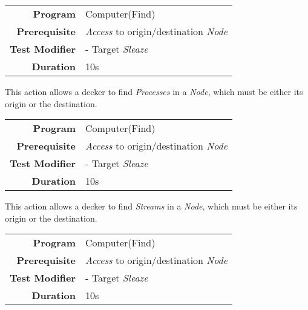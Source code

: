 \label{par:find process}


\begin{tabular}{rl}
    \textbf{Program}       & Computer(Find)                                  \\
    \textbf{Prerequisite}  & \emph{Access} to origin/destination \emph{Node} \\
    \textbf{Test Modifier} & - Target \emph{Sleaze}                          \\
    \textbf{Duration}      & 10s                                             \\
\end{tabular}

\hfill

This action allows a decker to find \emph{Processes} in a \emph{Node}, which must be either its
origin or the destination.

\label{par:find stream}


\begin{tabular}{rl}
    \textbf{Program}       & Computer(Find)                                  \\
    \textbf{Prerequisite}  & \emph{Access} to origin/destination \emph{Node} \\
    \textbf{Test Modifier} & - Target \emph{Sleaze}                          \\
    \textbf{Duration}      & 10s                                             \\
\end{tabular}

\hfill

This action allows a decker to find \emph{Streams} in a \emph{Node}, which must be either its
origin or the destination.

\label{par:find file}

\begin{tabular}{rl}
    \textbf{Program}       & Computer(Find)                                  \\
    \textbf{Prerequisite}  & \emph{Access} to origin/destination \emph{Node} \\
    \textbf{Test Modifier} & - Target \emph{Sleaze}                          \\
    \textbf{Duration}      & 10s                                             \\
\end{tabular}


